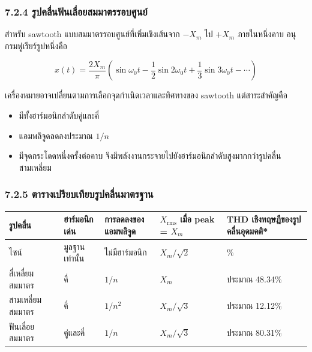 \subsubsection{7.2.4 รูปคลื่นฟันเลื่อยสมมาตรรอบศูนย์}

สำหรับ sawtooth แบบสมมาตรรอบศูนย์ที่เพิ่มเชิงเส้นจาก $-X_m$ ไป $+X_m$ ภายในหนึ่งคาบ อนุกรมฟูเรียร์รูปหนึ่งคือ

\[
x(t)=\frac{2X_m}{\pi}\left(\sin\omega_0 t-\frac{1}{2}\sin2\omega_0 t+\frac{1}{3}\sin3\omega_0 t-\cdots\right)
\]

เครื่องหมายอาจเปลี่ยนตามการเลือกจุดกำเนิดเวลาและทิศทางของ sawtooth แต่สาระสำคัญคือ

\begin{itemize}
    \item มีทั้งฮาร์มอนิกลำดับคู่และคี่
    \item แอมพลิจูดลดลงประมาณ $1/n$
    \item มีจุดกระโดดหนึ่งครั้งต่อคาบ จึงมีพลังงานกระจายไปยังฮาร์มอนิกลำดับสูงมากกว่ารูปคลื่นสามเหลี่ยม
\end{itemize}

\subsubsection{7.2.5 ตารางเปรียบเทียบรูปคลื่นมาตรฐาน}

\begin{table}[htbp]
    \centering
    \small
    \begin{tabularx}{\textwidth}{>{\raggedright\arraybackslash}p{} >{\raggedright\arraybackslash}p{} >{\raggedright\arraybackslash}X >{\centering\arraybackslash}p{} >{\raggedright\arraybackslash}p{}}
        \hline
        \textbf{รูปคลื่น} & \textbf{ฮาร์มอนิกเด่น} & \textbf{การลดลงของแอมพลิจูด} & \textbf{$X_{\mathrm{rms}}$ เมื่อ peak = $X_m$} & \textbf{THD เชิงทฤษฎีของรูปคลื่นอุดมคติ*} \\
        \hline
        ไซน์ & มูลฐานเท่านั้น & ไม่มีฮาร์มอนิก & $X_m/\sqrt{2}$ & 0\% \\
        สี่เหลี่ยมสมมาตร & คี่ & $1/n$ & $X_m$ & ประมาณ 48.34\% \\
        สามเหลี่ยมสมมาตร & คี่ & $1/n^2$ & $X_m/\sqrt{3}$ & ประมาณ 12.12\% \\
        ฟันเลื่อยสมมาตร & คู่และคี่ & $1/n$ & $X_m/\sqrt{3}$ & ประมาณ 80.31\% \\
        \hline
    \end{tabularx}
\end{table}

